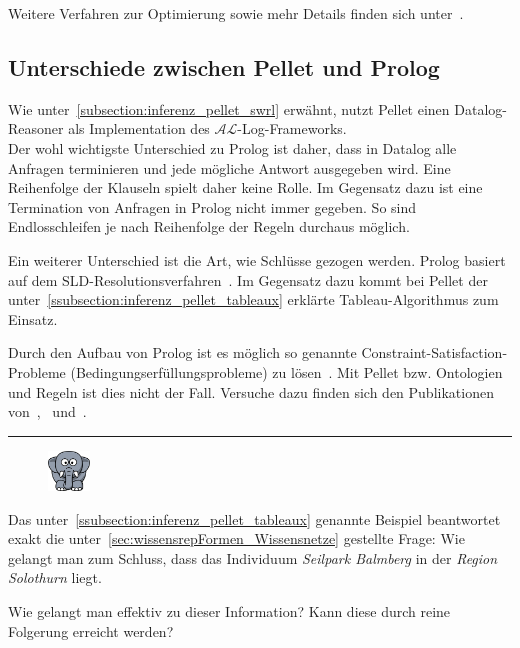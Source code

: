 Weitere Verfahren zur Optimierung sowie mehr Details finden sich unter~\cite[S. 17 - 19]{sirin:pellet05}.

\subsection{Unterschiede zwischen Pellet und Prolog}
\label{subsec:inferenz_pellet_prolog}
Wie unter~\ref{subsection:inferenz_pellet_swrl} erwähnt, nutzt Pellet einen Datalog-Reasoner als Implementation des $\mathcal{AL}$-Log-Frameworks.\\
Der wohl wichtigste Unterschied zu Prolog ist daher, dass in Datalog alle Anfragen terminieren und jede mögliche Antwort ausgegeben wird. Eine Reihenfolge der Klauseln spielt daher keine Rolle. Im Gegensatz dazu ist eine Termination von Anfragen in Prolog nicht immer gegeben. So sind Endlosschleifen je nach Reihenfolge der Regeln durchaus möglich.~\cite[S. 175]{laemmel}

Ein weiterer Unterschied ist die Art, wie Schlüsse gezogen werden. Prolog basiert auf dem SLD-Resolutionsverfahren~\citep[Details siehe][S. 68]{laemmel}. Im Gegensatz dazu kommt bei Pellet der unter~\ref{ssubsection:inferenz_pellet_tableaux} erklärte Tableau-Algorithmus zum Einsatz.

Durch den Aufbau von Prolog ist es möglich so genannte Constraint-Satisfaction-Probleme (Bedingungserfüllungsprobleme) zu lösen~\citep[Details siehe][S. 148]{laemmel}. Mit Pellet bzw. Ontologien und Regeln ist dies nicht der Fall. Versuche dazu finden sich den Publikationen von~\citet{xiong2008constraint},~\citet{staab2006constraint} und~\citet{bramer2007constraint}.

\noindent\rule[1ex]{\textwidth}{1pt}
\begin{figure}
    \vspace{-12pt}
    \includegraphics[width=0.1\textwidth]{bilder/elephant.png}
\end{figure}
Das unter~\ref{ssubsection:inferenz_pellet_tableaux} genannte Beispiel beantwortet exakt die unter~\ref{sec:wissensrepFormen_Wissensnetze} gestellte Frage: Wie gelangt man zum Schluss, dass das Individuum \textit{Seilpark Balmberg} in der \textit{Region} \textit{Solothurn} liegt.

Wie gelangt man effektiv zu dieser Information? Kann diese durch reine Folgerung erreicht werden?

